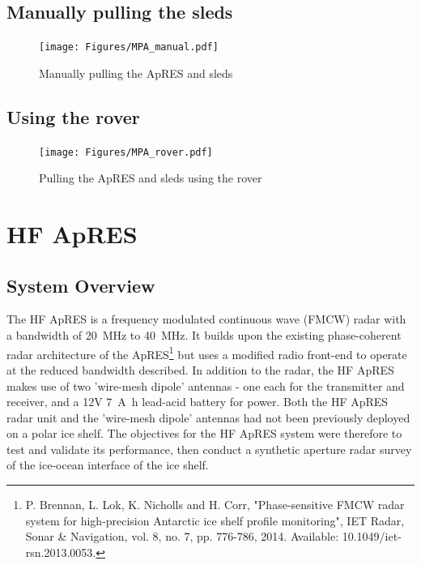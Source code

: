\documentclass[a4paper,12pt]{article}
\begin{document}
\subsection{Manually pulling the sleds}
\begin{figure}[H]
	\texttt{[image: Figures/MPA\_manual.pdf]}
	\caption{Manually pulling the ApRES and sleds}
	\label{fig_MPA_manual}
\end{figure}

\subsection{Using the rover}
\begin{figure}[H]
	\texttt{[image: Figures/MPA\_rover.pdf]}
	\caption{Pulling the ApRES and sleds using the rover}
	\label{fig_MPA_rover}
\end{figure}
\pagebreak
\section{HF ApRES}
\label{SecHFApRES}

\subsection{System Overview}
The HF ApRES is a frequency modulated continuous wave (FMCW) radar with 
a bandwidth of \SI{20}{\mega\hertz} to \SI{40}{\mega\hertz}.  It builds
upon the existing phase-coherent radar architecture of the ApRES\footnote{
  P. Brennan, L. Lok, K. Nicholls and H. Corr, "Phase‐sensitive FMCW radar 
  system for high‐precision Antarctic ice shelf profile monitoring", IET 
  Radar, Sonar \& Navigation, vol. 8, no. 7, pp. 776-786, 2014. Available: 
  10.1049/iet-rsn.2013.0053.
} but uses a modified radio front-end to operate at the reduced bandwidth
described.  In addition to the radar, the HF ApRES makes use of two 'wire-mesh
dipole' antennas - one each for the transmitter and receiver, and a 12V 
\SI{7}{\ampere\hour} lead-acid battery for power.  Both the HF ApRES radar unit 
and  the 'wire-mesh dipole' antennas had not been previously deployed on a 
polar ice shelf.  The objectives for the HF ApRES system were therefore to test
and validate its performance, then conduct a synthetic aperture radar survey of
the ice-ocean interface of the ice shelf.
\end{document}
